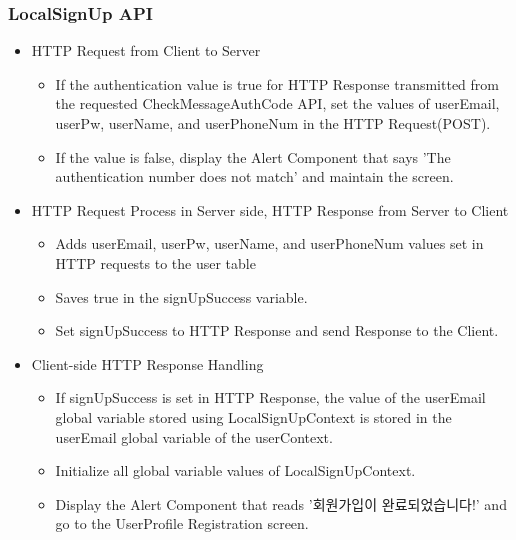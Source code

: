 \documentclass[conference]{IEEEtran}
\begin{document}
\subsubsection{LocalSignUp API}
\begin{itemize}
    \item HTTP Request from Client to Server 
    \begin{itemize}
        \item If the authentication value is true for HTTP Response transmitted from the requested CheckMessageAuthCode API, set the values of userEmail, userPw, userName, and userPhoneNum in the HTTP Request(POST).
        \item If the value is false, display the Alert Component that says 'The authentication number does not match' and maintain the screen.
        \\
    \end{itemize}
    \item HTTP Request Process in Server side, HTTP Response from Server to Client 
    \begin{itemize}
        \item Adds userEmail, userPw, userName, and userPhoneNum values set in HTTP requests to the user table
        \item Saves true in the signUpSuccess variable.
        \item Set signUpSuccess to HTTP Response and send Response to the Client.
    \end{itemize}
    \item Client-side HTTP Response Handling
    \begin{itemize}
        \item If signUpSuccess is set in HTTP Response, the value of the userEmail global variable stored using LocalSignUpContext is stored in the userEmail global variable of the userContext.
        \item Initialize all global variable values of LocalSignUpContext.
        \item Display the Alert Component that reads '회원가입이 완료되었습니다!' and go to the UserProfile Registration screen.
    \end{itemize}
\end{itemize}
\end{document}
